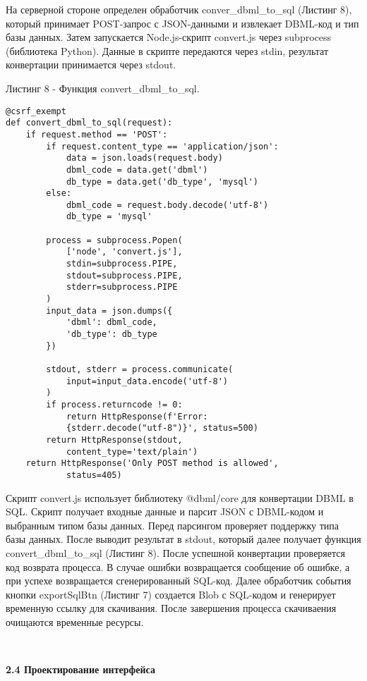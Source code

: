 \newpage
На серверной стороне определен обработчик conver\_dbml\_to\_sql (Листинг 8), который принимает POST-запрос с JSON-данными и извлекает DBML-код и тип базы данных. Затем запускается Node.js-скрипт convert.js через subprocess (библиотека Python). Данные в скрипте передаются через stdin, результат конвертации принимается через stdout.

Листинг 8 - Функция convert\_dbml\_to\_sql.
\begin{lstlisting}[frame=single]
@csrf_exempt
def convert_dbml_to_sql(request):
    if request.method == 'POST':
        if request.content_type == 'application/json':
            data = json.loads(request.body)
            dbml_code = data.get('dbml')
            db_type = data.get('db_type', 'mysql')
        else:
            dbml_code = request.body.decode('utf-8')
            db_type = 'mysql'

        process = subprocess.Popen(
            ['node', 'convert.js'],
            stdin=subprocess.PIPE,
            stdout=subprocess.PIPE,
            stderr=subprocess.PIPE
        )
        input_data = json.dumps({
            'dbml': dbml_code,
            'db_type': db_type
        })

        stdout, stderr = process.communicate(
            input=input_data.encode('utf-8')
        )
        if process.returncode != 0:
            return HttpResponse(f'Error: 
            {stderr.decode("utf-8")}', status=500)
        return HttpResponse(stdout, 
            content_type='text/plain')
    return HttpResponse('Only POST method is allowed', 
            status=405)
\end{lstlisting}

Скрипт convert.js использует библиотеку @dbml/core для конвертации 
DBML в SQL. Скрипт получает входные данные и парсит JSON с DBML-кодом и выбранным типом базы данных. Перед парсингом проверяет поддержку типа базы данных. После выводит результат в stdout, который далее получает функция convert\_dbml\_to\_sql (Листинг 8). После успешной конвертации проверяется код возврата процесса. В случае ошибки возвращается сообщение об ошибке, а при успехе возвращается сгенерированный SQL-код. Далее обработчик события кнопки exportSqlBtn (Листинг 7) создается Blob с SQL-кодом и генерирует временную ссылку для скачивания. После завершения процесса скачиваения очищаются временные ресурсы.

\

\textbf{2.4 Проектирование интерфейса}

